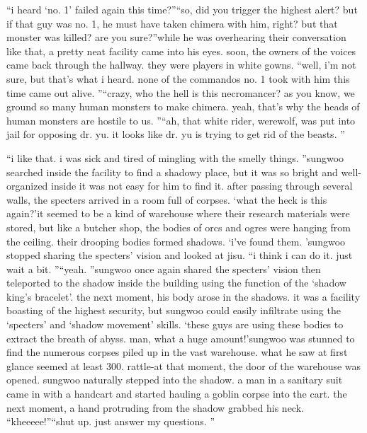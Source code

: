 “i heard ‘no.
 1’ failed again this time?”“so, did you trigger the highest alert? but if that guy was no.
 1, he must have taken chimera with him, right? but that monster was killed? are you sure?”while he was overhearing their conversation like that, a pretty neat facility came into his eyes.
 soon, the owners of the voices came back through the hallway.
 they were players in white gowns.
“well, i’m not sure, but that’s what i heard.
 none of the commandos no.
 1 took with him this time came out alive.
”“crazy, who the hell is this necromancer? as you know, we ground so many human monsters to make chimera.
 yeah, that’s why the heads of human monsters are hostile to us.
”“ah, that white rider, werewolf, was put into jail for opposing dr.
 yu.
 it looks like dr.
 yu is trying to get rid of the beasts.
”

“i like that.
 i was sick and tired of mingling with the smelly things.
”sungwoo searched inside the facility to find a shadowy place, but it was so bright and well-organized inside it was not easy for him to find it.
after passing through several walls, the specters arrived in a room full of corpses.
‘what the heck is this again?’it seemed to be a kind of warehouse where their research materials were stored, but like a butcher shop, the bodies of orcs and ogres were hanging from the ceiling.
 their drooping bodies formed shadows.
‘i’ve found them.
’sungwoo stopped sharing the specters’ vision and looked at jisu.
“i think i can do it.
 just wait a bit.
”“yeah.
”sungwoo once again shared the specters’ vision then teleported to the shadow inside the building using the function of the ‘shadow king’s bracelet’.
the next moment, his body arose in the shadows.
 it was a facility boasting of the highest security, but sungwoo could easily infiltrate using the ‘specters’ and ‘shadow movement’ skills.
‘these guys are using these bodies to extract the breath of abyss.
 man, what a huge amount!’sungwoo was stunned to find the numerous corpses piled up in the vast warehouse.
what he saw at first glance seemed at least 300.
rattle-at that moment, the door of the warehouse was opened.
 sungwoo naturally stepped into the shadow.
a man in a sanitary suit came in with a handcart and started hauling a goblin corpse into the cart.
 the next moment, a hand protruding from the shadow grabbed his neck.
“kheeeee!”“shut up.
 just answer my questions.
”

 